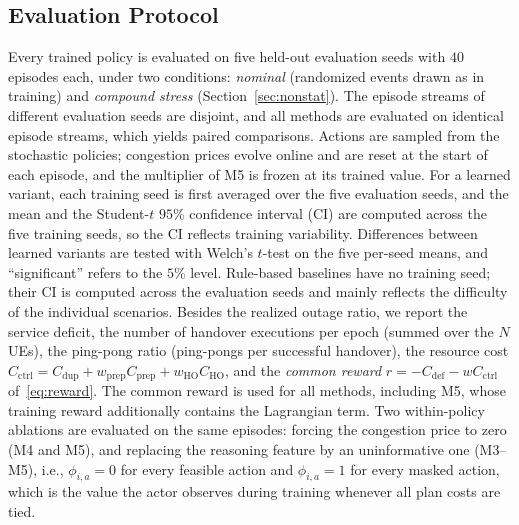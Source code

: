 \documentclass[journal]{IEEEtran}
\begin{document}
\subsection{Evaluation Protocol}
Every trained policy is evaluated on five held-out evaluation seeds with
$40$ episodes each, under two conditions: \emph{nominal} (randomized events
drawn as in training) and \emph{compound stress}
(Section~\ref{sec:nonstat}). The episode streams of different evaluation
seeds are disjoint, and all methods are evaluated on identical episode
streams, which yields paired comparisons. Actions are sampled from the
stochastic policies; congestion prices evolve online and are reset at the
start of each episode, and the multiplier of M5 is frozen at its trained
value. For a learned variant, each training seed is first averaged over the
five evaluation seeds, and the mean and the Student-$t$ $95\%$ confidence
interval (CI) are computed across the five training seeds, so the CI
reflects training variability. Differences between learned variants are
tested with Welch's $t$-test on the five per-seed means, and
``significant'' refers to the $5\%$ level. Rule-based baselines have no training seed;
their CI is computed across the evaluation seeds and mainly reflects the
difficulty of the individual scenarios. Besides the realized outage ratio,
we report the service deficit, the number of handover executions per epoch
(summed over the $N$ UEs), the ping-pong ratio (ping-pongs per successful
handover), the resource cost $C_{\mathrm{ctrl}}=C_{\mathrm{dup}}+w_{\mathrm{prep}}C_{\mathrm{prep}}+w_{\mathrm{HO}}C_{\mathrm{HO}}$,
and the \emph{common reward} $r=-C_{\mathrm{def}}-w C_{\mathrm{ctrl}}$
of~\eqref{eq:reward}. The common reward is used for all methods, including
M5, whose training reward additionally contains the Lagrangian term.
Two within-policy ablations are evaluated on the same episodes: forcing the
congestion price to zero (M4 and M5), and replacing the reasoning feature by an
uninformative one (M3--M5), i.e., $\phi_{i,a}=0$ for every feasible action and
$\phi_{i,a}=1$ for every masked action, which is the value the actor observes
during training whenever all plan costs are tied.
\end{document}
